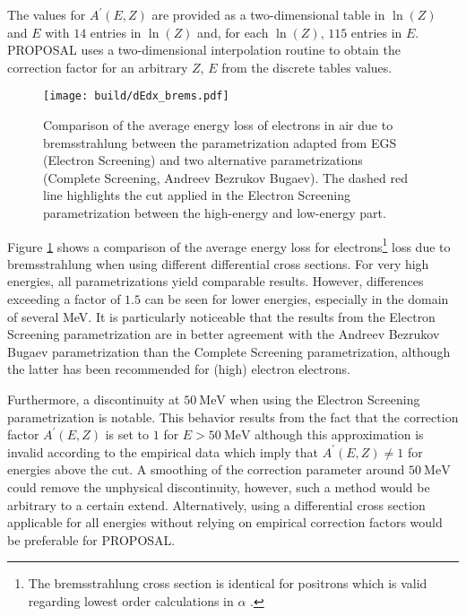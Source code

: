 The values for $A^{\prime}(E,Z)$ are provided as a two-dimensional table in $\ln(Z)$ and $E$ with $\num{14}$ entries in $\ln(Z)$ and, for each $\ln(Z)$, $\num{115}$ entries in $E$.  
PROPOSAL uses a two-dimensional interpolation routine to obtain the correction factor for an arbitrary $Z$, $E$ from the discrete tables values.

\begin{figure}
    \centering
    \texttt{[image: build/dEdx\_brems.pdf]}
    \caption{Comparison of the average energy loss of electrons in air due to bremsstrahlung between the parametrization adapted from EGS (Electron Screening) and two alternative parametrizations (Complete Screening, Andreev Bezrukov Bugaev). The dashed red line highlights the cut applied in the Electron Screening parametrization between the high-energy and low-energy part.}
    \label{fig:dEdx_brems}
\end{figure}


Figure \ref{fig:dEdx_brems} shows a comparison of the average energy loss for electrons\footnote{The bremsstrahlung cross section is identical for positrons which is valid regarding lowest order calculations in $\alpha$ \cite{RevModPhys.46.815}.} loss due to bremsstrahlung when using different differential cross sections.
For very high energies, all parametrizations yield comparable results.
However, differences exceeding a factor of $\num{1.5}$ can be seen for lower energies, especially in the domain of several \si{\mega\electronvolt}.
It is particularly noticeable that the results from the Electron Screening parametrization are in better agreement with the Andreev Bezrukov Bugaev parametrization than the Complete Screening parametrization, although the latter has been recommended for (high) electron electrons.

Furthermore, a discontinuity at $\SI{50}{\mega\electronvolt}$ when using the Electron Screening parametrization is notable.
This behavior results from the fact that the correction factor $A^{\prime}(E,Z)$ is set to $1$ for $E > \SI{50}{\mega\electronvolt}$ although this approximation is invalid according to the empirical data which imply that $A^{\prime}(E,Z) \neq 1$ for energies above the cut.
A smoothing of the correction parameter around $\SI{50}{\mega\electronvolt}$ could remove the unphysical discontinuity, however, such a method would be arbitrary to a certain extend.
Alternatively, using a differential cross section applicable for all energies without relying on empirical correction factors would be preferable for PROPOSAL. 

